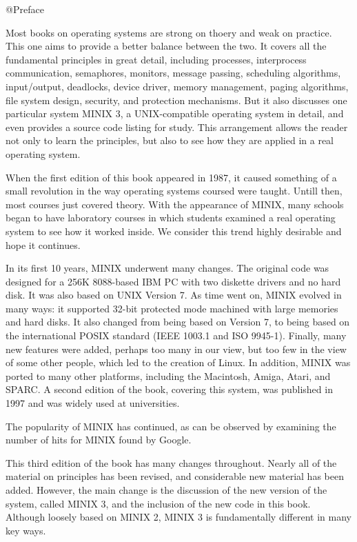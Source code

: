 \documentclass{book}
\begin{document}
@Preface

Most books on operating systems are strong on thoery and weak on practice. 
This one aims to provide a better balance between the two.
It covers all the fundamental principles in great detail, 
including processes, interprocess communication, semaphores, monitors, message passing, 
scheduling algorithms, input/output, deadlocks, device driver, memory management, paging algorithms,
file system design, security, and protection mechanisms.
But it also discusses one particular system MINIX 3, a UNIX-compatible operating system in detail, 
and even provides a source code listing for study.
This arrangement allows the reader not only to learn the principles, but also to see how they are applied in a real operating system.

When the first edition of this book appeared in 1987, it caused something of a small revolution in the way operating systems coursed were taught.
Untill then, most courses just covered theory.
With the appearance of MINIX, 
many schools began to have laboratory courses in which students examined a real operating system to see how it worked inside.
We consider this trend highly desirable and hope it continues.

In its first 10 years, MINIX underwent many changes.
The original code was designed for a 256K 8088-based IBM PC with two diskette drivers and no hard disk.
It was also based on UNIX Version 7. 
As time went on, MINIX evolved in many ways: it supported 32-bit protected mode machined with large memories and hard disks.
It also changed from being based on Version 7, to being based on the international POSIX standard (IEEE 1003.1 and ISO 9945-1).
Finally, many new features were added, perhaps too many in our view, but too few in the view of some other people, which led to the creation of Linux.
In addition, MINIX was ported to many other platforms, including the Macintosh, Amiga, Atari, and SPARC.
A second edition of the book, covering this system, was published in 1997 and was widely used at universities.

The popularity of MINIX has continued, as can be observed by examining the number of hits for MINIX found by Google.
 
This third edition of the book has many changes throughout.
Nearly all of the material on principles has been revised, and considerable new material has been added.
However, the main change is the discussion of the new version of the system, called MINIX 3, and the inclusion of the new code in this book.
Although loosely based on MINIX 2, MINIX 3 is fundamentally different in many key ways.
\end{document}
